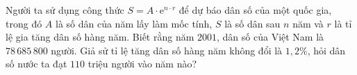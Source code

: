 \begin{bt}%
	Người ta sử dụng công thức $S=A\cdot \mathrm{e}^{n\cdot r}$ để dự báo dân số của một quốc gia, trong đó $A$ là số dân của năm lấy làm mốc tính, $S$ là số dân sau $n$ năm và $r$ là tỉ lệ gia tăng dân số hàng năm. Biết rằng năm $2001$, dân số của Việt Nam là $78\,685\,800$ người. Giả sử tỉ lệ tăng dân số hàng năm không đổi là $1,2\%$, hỏi dân số nước ta đạt $110$ triệu người vào năm nào? 
\end{bt}

